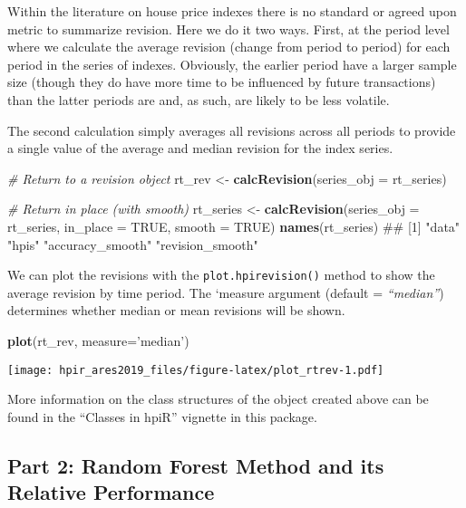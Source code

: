 \documentclass[]{article}
\newenvironment{Shaded}{\begin{snugshade}}{\end{snugshade}}
\newcommand{\KeywordTok}[1]{\textcolor[rgb]{0.13,0.29,0.53}{\textbf{#1}}}
\newcommand{\DataTypeTok}[1]{\textcolor[rgb]{0.13,0.29,0.53}{#1}}
\newcommand{\StringTok}[1]{\textcolor[rgb]{0.31,0.60,0.02}{#1}}
\newcommand{\CommentTok}[1]{\textcolor[rgb]{0.56,0.35,0.01}{\textit{#1}}}
\newcommand{\OtherTok}[1]{\textcolor[rgb]{0.56,0.35,0.01}{#1}}
\newcommand{\NormalTok}[1]{#1}
\begin{document}
Within the literature on house price indexes there is no standard or
agreed upon metric to summarize revision. Here we do it two ways. First,
at the period level where we calculate the average revision (change from
period to period) for each period in the series of indexes. Obviously,
the earlier period have a larger sample size (though they do have more
time to be influenced by future transactions) than the latter periods
are and, as such, are likely to be less volatile.

The second calculation simply averages all revisions across all periods
to provide a single value of the average and median revision for the
index series.

\begin{Shaded}
\begin{Highlighting}[]

  \CommentTok{# Return to a revision object}
\NormalTok{  rt_rev <-}\StringTok{ }\KeywordTok{calcRevision}\NormalTok{(}\DataTypeTok{series_obj =}\NormalTok{ rt_series)}

  \CommentTok{# Return in place (with smooth)}
\NormalTok{  rt_series <-}\StringTok{ }\KeywordTok{calcRevision}\NormalTok{(}\DataTypeTok{series_obj =}\NormalTok{ rt_series,}
                            \DataTypeTok{in_place =} \OtherTok{TRUE}\NormalTok{,}
                            \DataTypeTok{smooth =} \OtherTok{TRUE}\NormalTok{)}
  \KeywordTok{names}\NormalTok{(rt_series)}
\NormalTok{## [1] "data"            "hpis"            "accuracy_smooth" "revision_smooth"}
\end{Highlighting}
\end{Shaded}

We can plot the revisions with the \texttt{plot.hpirevision()} method to
show the average revision by time period. The `measure argument (default
= \emph{``median''}) determines whether median or mean revisions will be
shown.

\begin{Shaded}
\begin{Highlighting}[]
  \KeywordTok{plot}\NormalTok{(rt_rev, }\DataTypeTok{measure=}\StringTok{'median'}\NormalTok{)}
\end{Highlighting}
\end{Shaded}

\texttt{[image: hpir\_ares2019\_files/figure-latex/plot\_rtrev-1.pdf]}

More information on the class structures of the object created above can
be found in the ``Classes in hpiR'' vignette in this package.

\subsection{Part 2: Random Forest Method and its Relative
Performance}\label{part-2-random-forest-method-and-its-relative-performance}
\end{document}

